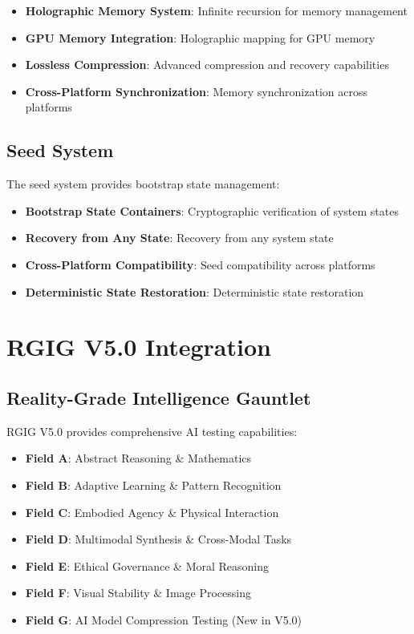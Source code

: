\documentclass[12pt,a4paper]{article}
\begin{document}
\begin{itemize}
    \item \textbf{Holographic Memory System}: Infinite recursion for memory management
    \item \textbf{GPU Memory Integration}: Holographic mapping for GPU memory
    \item \textbf{Lossless Compression}: Advanced compression and recovery capabilities
    \item \textbf{Cross-Platform Synchronization}: Memory synchronization across platforms
\end{itemize}

\subsection{Seed System}
The seed system provides bootstrap state management:

\begin{itemize}
    \item \textbf{Bootstrap State Containers}: Cryptographic verification of system states
    \item \textbf{Recovery from Any State}: Recovery from any system state
    \item \textbf{Cross-Platform Compatibility}: Seed compatibility across platforms
    \item \textbf{Deterministic State Restoration}: Deterministic state restoration
\end{itemize}

\newpage

\section{RGIG V5.0 Integration}

\subsection{Reality-Grade Intelligence Gauntlet}
RGIG V5.0 provides comprehensive AI testing capabilities:

\begin{itemize}
    \item \textbf{Field A}: Abstract Reasoning \& Mathematics
    \item \textbf{Field B}: Adaptive Learning \& Pattern Recognition
    \item \textbf{Field C}: Embodied Agency \& Physical Interaction
    \item \textbf{Field D}: Multimodal Synthesis \& Cross-Modal Tasks
    \item \textbf{Field E}: Ethical Governance \& Moral Reasoning
    \item \textbf{Field F}: Visual Stability \& Image Processing
    \item \textbf{Field G}: AI Model Compression Testing (New in V5.0)
\end{itemize}
\end{document}
